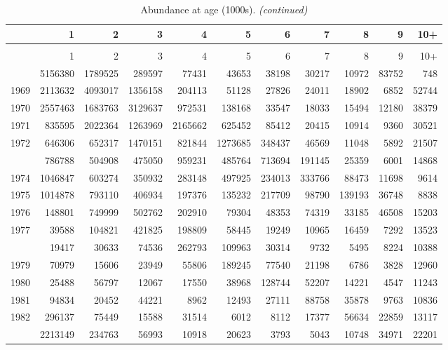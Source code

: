 \documentclass[
]{article}
\begin{document}
\begin{longtable}[t]{lrrrrrrrrrr}
\caption{\label{tab:NAA-table}Abundance at age (1000s).}\\
\toprule
  & 1 & 2 & 3 & 4 & 5 & 6 & 7 & 8 & 9 & 10+\\
\midrule
\endfirsthead
\caption[]{Abundance at age (1000s). \textit{(continued)}}\\
\toprule
  & 1 & 2 & 3 & 4 & 5 & 6 & 7 & 8 & 9 & 10+\\
\midrule
\endhead

\endfoot
\bottomrule
\endlastfoot
1968 & 5156380 & 1789525 & 289597 & 77431 & 43653 & 38198 & 30217 & 10972 & 83752 & 748\\
1969 & 2113632 & 4093017 & 1356158 & 204113 & 51128 & 27826 & 24011 & 18902 & 6852 & 52744\\
1970 & 2557463 & 1683763 & 3129637 & 972531 & 138168 & 33547 & 18033 & 15494 & 12180 & 38379\\
1971 & 835595 & 2022364 & 1263969 & 2165662 & 625452 & 85412 & 20415 & 10914 & 9360 & 30521\\
1972 & 646306 & 652317 & 1470151 & 821844 & 1273685 & 348437 & 46569 & 11048 & 5892 & 21507\\
\addlinespace
1973 & 786788 & 504908 & 475050 & 959231 & 485764 & 713694 & 191145 & 25359 & 6001 & 14868\\
1974 & 1046847 & 603274 & 350932 & 283148 & 497925 & 234013 & 333766 & 88473 & 11698 & 9614\\
1975 & 1014878 & 793110 & 406934 & 197376 & 135232 & 217709 & 98790 & 139193 & 36748 & 8838\\
1976 & 148801 & 749999 & 502762 & 202910 & 79304 & 48353 & 74319 & 33185 & 46508 & 15203\\
1977 & 39588 & 104821 & 421825 & 198809 & 58445 & 19249 & 10965 & 16459 & 7292 & 13523\\
\addlinespace
1978 & 19417 & 30633 & 74536 & 262793 & 109963 & 30314 & 9732 & 5495 & 8224 & 10388\\
1979 & 70979 & 15606 & 23949 & 55806 & 189245 & 77540 & 21198 & 6786 & 3828 & 12960\\
1980 & 25488 & 56797 & 12067 & 17550 & 38968 & 128744 & 52207 & 14221 & 4547 & 11243\\
1981 & 94834 & 20452 & 44221 & 8962 & 12493 & 27111 & 88758 & 35878 & 9763 & 10836\\
1982 & 296137 & 75449 & 15588 & 31514 & 6012 & 8112 & 17377 & 56634 & 22859 & 13117\\
\addlinespace
1983 & 2213149 & 234763 & 56993 & 10918 & 20623 & 3793 & 5043 & 10748 & 34971 & 22201\\

\end{longtable}
\end{document}
